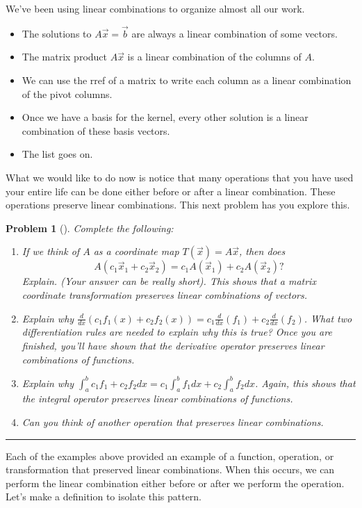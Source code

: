 \documentclass[letterpaper,oneside]{book}%
\newcommand{\ds}{\displaystyle}
\theoremstyle{plain}
\theoremstyle{box}
\theoremstyle{problem}
\newtheorem{problemnum}{Problem}[chapter]
\newenvironment{problem}[1][]{\begin{problemnum}[#1]}{\end{problemnum}\nopagebreak\hrule\bigskip}
\begin{document}
 
We've been using linear combinations to organize almost all our work.  
 \begin{itemize}
  \item The solutions to $A\vec x = \vec b$ are always a linear combination of some vectors.  
  \item The matrix product $A\vec x$ is a linear combination of the columns of $A$. 
  \item We can use the rref of a matrix to write each column as a linear combination of the pivot columns. 
  \item Once we have a basis for the kernel, every other solution is a linear combination of these basis vectors. 
  \item The list goes on.
 \end{itemize}
What we would like to do now is notice that many operations that you have used your entire life can be done either before or after a linear combination.  These operations preserve linear combinations.   This next problem has you explore this.
\begin{problem} Complete the following:\label{linear function examples}
\begin{enumerate}
 \item If we think of $A$ as a coordinate map $T(\vec x) = A\vec x$, then does $$A(c_1\vec x_1+c_2\vec x_2) = c_1A(\vec x_1)+c_2A(\vec x_2)?$$ Explain. (Your answer can be really short). This shows that a matrix coordinate transformation preserves linear combinations of vectors. 
 \item Explain why $\ds\frac{d}{dx}(c_1f_1(x)+c_2f_2(x)) = c_1\frac{d}{dx}(f_1)+c_2\frac{d}{dx}(f_2)$. What two differentiation rules are needed to explain why this is true?  Once you are finished, you'll have shown that the derivative operator preserves linear combinations of functions.
 \item Explain why $\ds \int_a^b c_1f_1+c_2f_2 dx = c_1\int_a^b f_1dx+c_2\int_a^b f_2dx$. Again, this shows that the integral operator preserves linear combinations of functions.
 \item Can you think of another operation that preserves linear combinations.
\end{enumerate}

\end{problem}

Each of the examples above provided an example of a function, operation, or transformation that preserved linear combinations. When this occurs, we can perform the linear combination either before or after we perform the operation.  Let's make a definition to isolate this pattern. 
\end{document}
